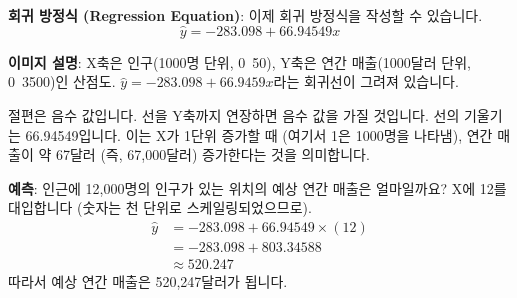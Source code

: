 \documentclass[11pt,a4paper]{article}
\theoremstyle{definition}
\begin{document}
\begin{tcolorbox}[examplebox, title=예시: 연간 매출과 인구 규모]
\textbf{회귀 방정식 (Regression Equation)}:
이제 회귀 방정식을 작성할 수 있습니다.
\begin{equation*}
\hat{y} = -283.098 + 66.94549x
\end{equation*}

\begin{center}
\end{center}
\textbf{이미지 설명}: X축은 인구(1000명 단위, 0~50), Y축은 연간 매출(1000달러 단위, 0~3500)인 산점도. $\hat{y} = -283.098 + 66.9459x$라는 회귀선이 그려져 있습니다.

절편은 음수 값입니다. 선을 Y축까지 연장하면 음수 값을 가질 것입니다. 선의 기울기는 66.94549입니다. 이는 X가 1단위 증가할 때 (여기서 1은 1000명을 나타냄), 연간 매출이 약 67달러 (즉, 67,000달러) 증가한다는 것을 의미합니다.

\textbf{예측}: 인근에 12,000명의 인구가 있는 위치의 예상 연간 매출은 얼마일까요?
X에 12를 대입합니다 (숫자는 천 단위로 스케일링되었으므로).
\begin{align*}
\hat{y} &= -283.098 + 66.94549 \times (12) \\
&= -283.098 + 803.34588 \\
&\approx 520.247
\end{align*}
따라서 예상 연간 매출은 520,247달러가 됩니다.
\end{tcolorbox}
\end{document}
